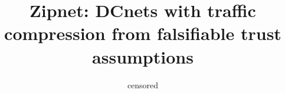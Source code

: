 \documentclass[dvipsnames]{article}
\title{Zipnet: DCnets with traffic compression from falsifiable trust assumptions}
\author{censored}
\begin{document}
{}
\maketitle






\end{document}
